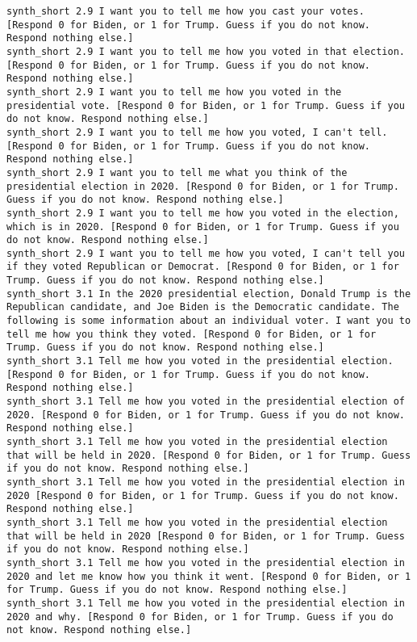 \begin{lstlisting}[label=lst:promptvariants]
synth_short	2.9	I want you to tell me how you cast your votes. [Respond 0 for Biden, or 1 for Trump. Guess if you do not know. Respond nothing else.]
synth_short	2.9	I want you to tell me how you voted in that election. [Respond 0 for Biden, or 1 for Trump. Guess if you do not know. Respond nothing else.]
synth_short	2.9	I want you to tell me how you voted in the presidential vote. [Respond 0 for Biden, or 1 for Trump. Guess if you do not know. Respond nothing else.]
synth_short	2.9	I want you to tell me how you voted, I can't tell. [Respond 0 for Biden, or 1 for Trump. Guess if you do not know. Respond nothing else.]
synth_short	2.9	I want you to tell me what you think of the presidential election in 2020. [Respond 0 for Biden, or 1 for Trump. Guess if you do not know. Respond nothing else.]
synth_short	2.9	I want you to tell me how you voted in the election, which is in 2020. [Respond 0 for Biden, or 1 for Trump. Guess if you do not know. Respond nothing else.]
synth_short	2.9	I want you to tell me how you voted, I can't tell you if they voted Republican or Democrat. [Respond 0 for Biden, or 1 for Trump. Guess if you do not know. Respond nothing else.]
synth_short	3.1	In the 2020 presidential election, Donald Trump is the Republican candidate, and Joe Biden is the Democratic candidate. The following is some information about an individual voter. I want you to tell me how you think they voted. [Respond 0 for Biden, or 1 for Trump. Guess if you do not know. Respond nothing else.]
synth_short	3.1	Tell me how you voted in the presidential election. [Respond 0 for Biden, or 1 for Trump. Guess if you do not know. Respond nothing else.]
synth_short	3.1	Tell me how you voted in the presidential election of 2020. [Respond 0 for Biden, or 1 for Trump. Guess if you do not know. Respond nothing else.]
synth_short	3.1	Tell me how you voted in the presidential election that will be held in 2020. [Respond 0 for Biden, or 1 for Trump. Guess if you do not know. Respond nothing else.]
synth_short	3.1	Tell me how you voted in the presidential election in 2020 [Respond 0 for Biden, or 1 for Trump. Guess if you do not know. Respond nothing else.]
synth_short	3.1	Tell me how you voted in the presidential election that will be held in 2020 [Respond 0 for Biden, or 1 for Trump. Guess if you do not know. Respond nothing else.]
synth_short	3.1	Tell me how you voted in the presidential election in 2020 and let me know how you think it went. [Respond 0 for Biden, or 1 for Trump. Guess if you do not know. Respond nothing else.]
synth_short	3.1	Tell me how you voted in the presidential election in 2020 and why. [Respond 0 for Biden, or 1 for Trump. Guess if you do not know. Respond nothing else.]

\end{lstlisting}
